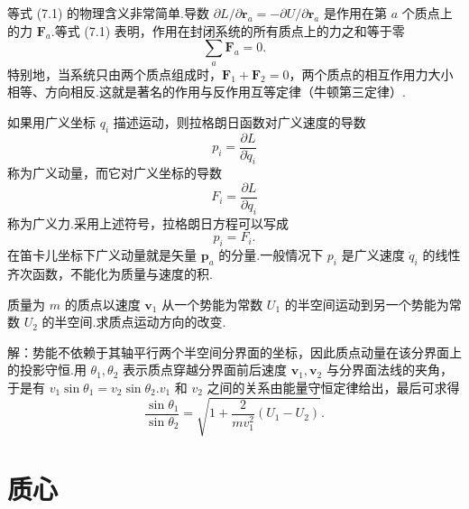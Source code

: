 等式 (7.1) 的物理含义非常简单.导数 $\partial L/\partial\boldsymbol{r}_a=-\partial U/\partial\boldsymbol{r}_a$ 是作用在第 $a$ 个质点上的力 $\boldsymbol{F}_a$.等式 (7.1) 表明，作用在封闭系统的所有质点上的力之和等于零
\begin{equation}
  \sum_a\boldsymbol{F}_a=0.
\end{equation}
特别地，当系统只由两个质点组成时，$\boldsymbol{F}_1+\boldsymbol{F}_2=0$，两个质点的相互作用力大小相等、方向相反.这就是著名的作用与反作用互等定律（牛顿第三定律）.

如果用广义坐标 $q_i$ 描述运动，则拉格朗日函数对广义速度的导数
\begin{equation}
  p_i=\frac{\partial L}{\partial\dot{q}_i}
\end{equation}
称为广义动量，而它对广义坐标的导数
\begin{equation}
  F_i=\frac{\partial L}{\partial q_i}
\end{equation}
称为广义力.采用上述符号，拉格朗日方程可以写成
\begin{equation}
  p_i=F_i.
\end{equation}
在笛卡儿坐标下广义动量就是矢量 $\boldsymbol{p}_a$ 的分量.一般情况下 $p_i$ 是广义速度 $\dot{q}_i$ 的线性齐次函数，不能化为质量与速度的积.

\begin{xiti}

\quad 质量为 $m$ 的质点以速度 $\boldsymbol{v}_1$ 从一个势能为常数 $U_1$ 的半空间运动到另一个势能为常数 $U_2$ 的半空间.求质点运动方向的改变.

解：势能不依赖于其轴平行两个半空间分界面的坐标，因此质点动量在该分界面上的投影守恒.用 $\theta_1,\theta_2$ 表示质点穿越分界面前后速度 $\boldsymbol{v}_1,\boldsymbol{v}_2$ 与分界面法线的夹角，于是有 $v_1\sin\theta_1=v_2\sin\theta_2$.$v_1$ 和 $v_2$ 之间的关系由能量守恒定律给出，最后可求得
\begin{equation*}
  \frac{\sin\theta_1}{\sin\theta_2}
  =\sqrt{1+\frac{2}{mv_1^2}(U_1-U_2)}.
\end{equation*}

\end{xiti}

\section{质心}

